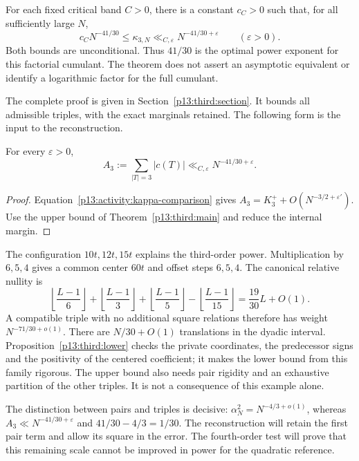 \begin{theorem}
\label{p13:third:main}
For each fixed critical band $C>0$, there is a constant $c_C>0$ such
that, for all sufficiently large $N$,
\begin{equation}
 c_C N^{-41/30}\leq\kappa_{3,N}
              \ll_{C,\varepsilon}N^{-41/30+\varepsilon}
              \qquad(\varepsilon>0).
 \label{p13:third:two-sided}
\end{equation}
Both bounds are unconditional.  Thus $41/30$ is the optimal power
exponent for this factorial cumulant.  The theorem does not assert an
asymptotic equivalent or identify a logarithmic factor for the full
cumulant.
\end{theorem}

The complete proof is given in Section~\ref{p13:third:section}.
It bounds all admissible triples, with the exact marginals retained.
The following form is the input to the reconstruction.

\begin{corollary}
\label{p13:third:activity}
For every $\varepsilon>0$,
\begin{equation}
 A_3:=\sum_{|T|=3}|c(T)|
            \ll_{C,\varepsilon}N^{-41/30+\varepsilon}.
 \label{p13:third:absolute}
\end{equation}
\end{corollary}

\begin{proof}
Equation~\eqref{p13:activity:kappa-comparison} gives
$A_3=K_3^++O(N^{-3/2+\varepsilon'})$.
Use the upper bound of Theorem~\ref{p13:third:main} and reduce the internal margin.
\end{proof}


The configuration $10t,12t,15t$ explains the third-order power.
Multiplication by $6,5,4$ gives a common center $60t$ and offset
steps $6,5,4$. The canonical relative nullity is
\[
 \left\lfloor\frac{L-1}{6}\right\rfloor+
 \left\lfloor\frac{L-1}{3}\right\rfloor+
 \left\lfloor\frac{L-1}{5}\right\rfloor-
 \left\lfloor\frac{L-1}{15}\right\rfloor
 =\frac{19}{30}L+O(1).
\]
A compatible triple with no additional square relations therefore has weight $N^{-71/30+o(1)}$.
There are $N/30+O(1)$ translations in the dyadic interval.
Proposition~\ref{p13:third:lower} checks the private coordinates,
the predecessor signs and the positivity of the centered coefficient;
it makes the lower bound from this family rigorous. The upper bound
also needs pair rigidity and an exhaustive partition of the other
triples. It is not a consequence of this example alone.

The distinction between pairs and triples is decisive:
$\alpha_N^2=N^{-4/3+o(1)}$, whereas
$A_3\ll N^{-41/30+\varepsilon}$ and $41/30-4/3=1/30$.
The reconstruction will retain the first pair term and allow its
square in the error. The fourth-order test will prove that this
remaining scale cannot be improved in power for the quadratic reference.
